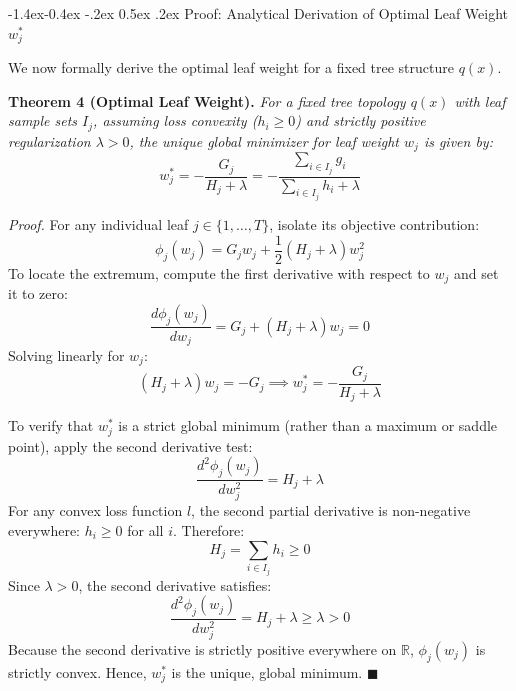 \documentclass[11pt,a4paper]{article}
\makeatletter
\renewcommand\subsection{\@startsection{subsection}{2}{\z@}%
                                     {-1.4ex\@plus -0.4ex \@minus -.2ex}%
                                     {0.5ex \@plus .2ex}%
                                     {\normalfont\normalsize\bfseries}}
\newcommand{\R}{\mathbb{R}}
\makeatother
\begin{document}
\subsection{Proof: Analytical Derivation of Optimal Leaf Weight \texorpdfstring{$w_j^*$}{w*}}

We now formally derive the optimal leaf weight for a fixed tree structure $q(x)$.

\textbf{Theorem 4 (Optimal Leaf Weight).} \emph{For a fixed tree topology $q(x)$ with leaf sample sets $I_j$, assuming loss convexity ($h_i \ge 0$) and strictly positive regularization $\lambda > 0$, the unique global minimizer for leaf weight $w_j$ is given by:}
\begin{equation}
    w_j^* = -\frac{G_j}{H_j + \lambda} = -\frac{\sum_{i \in I_j} g_i}{\sum_{i \in I_j} h_i + \lambda}
\end{equation}

\emph{Proof.} For any individual leaf $j \in \{1, \dots, T\}$, isolate its objective contribution:
\begin{equation}
    \phi_j(w_j) = G_j w_j + \frac{1}{2}(H_j + \lambda) w_j^2
\end{equation}
To locate the extremum, compute the first derivative with respect to $w_j$ and set it to zero:
\begin{equation}
    \frac{d \phi_j(w_j)}{d w_j} = G_j + (H_j + \lambda) w_j = 0
\end{equation}
Solving linearly for $w_j$:
\begin{equation}
    (H_j + \lambda) w_j = -G_j \implies w_j^* = -\frac{G_j}{H_j + \lambda}
\end{equation}

To verify that $w_j^*$ is a strict global minimum (rather than a maximum or saddle point), apply the second derivative test:
\begin{equation}
    \frac{d^2 \phi_j(w_j)}{d w_j^2} = H_j + \lambda
\end{equation}
For any convex loss function $l$, the second partial derivative is non-negative everywhere: $h_i \ge 0$ for all $i$. Therefore:
\begin{equation}
    H_j = \sum_{i \in I_j} h_i \ge 0
\end{equation}
Since $\lambda > 0$, the second derivative satisfies:
\begin{equation}
    \frac{d^2 \phi_j(w_j)}{d w_j^2} = H_j + \lambda \ge \lambda > 0
\end{equation}
Because the second derivative is strictly positive everywhere on $\R$, $\phi_j(w_j)$ is strictly convex. Hence, $w_j^*$ is the unique, global minimum. $\blacksquare$
\end{document}

